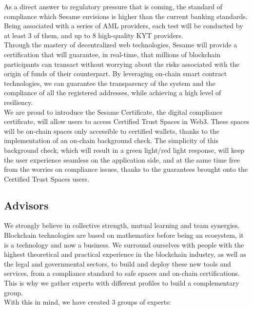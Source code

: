 ﻿\documentclass[a4paper]{article}
\let\OldTexttrademark\texttrademark
\renewcommand{\texttrademark}{\OldTexttrademark\xspace}%
\begin{document}
As a direct answer to regulatory pressure that is coming, the standard of compliance which Sesame envisions is higher than the current banking standards. Being associated with a series of AML providers, each test will be conducted by at least 3 of them, and up to 8 high-quality KYT providers. \\

Through the mastery of decentralized web technologies, Sesame will provide a certification that will guarantee, in real-time, that millions of blockchain participants can transact without worrying about the risks associated with the origin of funds of their counterpart. By leveraging on-chain smart contract technologies, we can guarantee the transparency of the system and the compliance of all the registered addresses, while achieving a high level of resiliency. \\

We are proud to introduce the Sesame Certificate, the digital compliance certificate, will allow users to access Certified Trust Spaces\texttrademark in Web3. These spaces will be on-chain spaces only accessible to certified wallets, thanks to the implementation of an on-chain background check. The simplicity of this background check, which will result in a green light/red light response, will keep the user experience seamless on the application side, and at the same time free from the worries on compliance issues, thanks to the guarantees brought onto the Certified Trust Spaces\texttrademark users.
\subsection{Advisors}
We strongly believe in collective strength, mutual learning and team synergies. Blockchain technologies are based on mathematics before being an ecosystem, it is a technology and now a business. We surround ourselves with people with the highest theoretical and practical experience in the blockchain industry, as well as the legal and governmental sectors, to build and deploy these new tools and services, from a compliance standard to safe spaces and on-chain certifications. This is why we gather experts with different profiles to build a complementary group. \\

With this in mind, we have created 3 groups of experts: 
\end{document}
